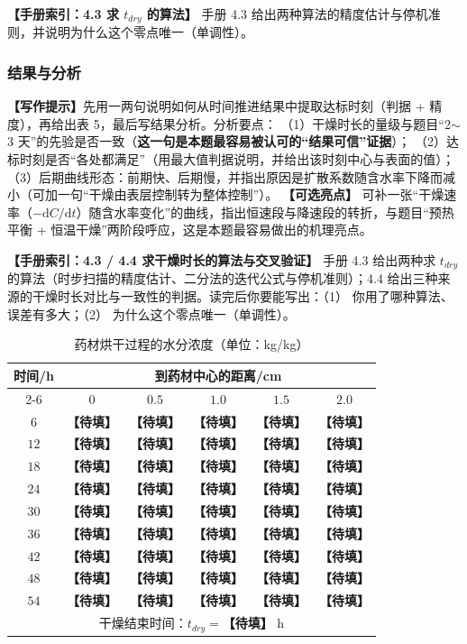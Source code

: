 \documentclass[12pt,a4paper]{article}
\newcommand{\prompt}[1]{\par\noindent\textbf{【写作提示】}#1\par}      %
\newcommand{\ph}[1]{\textbf{【#1】}}                                   %
\newcommand{\handbook}[2]{\par\noindent\textbf{【手册索引：#1】} #2\par}
\begin{document}
\handbook{4.3 求 $t_{dry}$ 的算法}{手册 4.3 给出两种算法的精度估计与停机准则，并说明为什么这个零点唯一（单调性）。}

\subsubsection{结果与分析}

\prompt{先用一两句说明如何从时间推进结果中提取达标时刻（判据 + 精度），再给出表 5，最后写结果分析。分析要点：
（1）干燥时长的量级与题目“2$\sim$3 天”的先验是否一致（\textbf{这一句是本题最容易被认可的“结果可信”证据}）；
（2）达标时刻是否“各处都满足”（用最大值判据说明，并给出该时刻中心与表面的值）；
（3）后期曲线形态：前期快、后期慢，并指出原因是扩散系数随含水率下降而减小（可加一句“干燥由表层控制转为整体控制”）。
\textbf{【可选亮点】} 可补一张“干燥速率（$-\mathrm{d}C/\mathrm{d}t$）随含水率变化”的曲线，指出恒速段与降速段的转折，与题目“预热平衡 + 恒温干燥”两阶段呼应，这是本题最容易做出的机理亮点。}

\handbook{4.3 / 4.4 求干燥时长的算法与交叉验证}{手册 4.3 给出两种求 $t_{dry}$ 的算法（时步扫描的精度估计、二分法的迭代公式与停机准则）；4.4 给出三种来源的干燥时长对比与一致性的判据。读完后你要能写出：（1） 你用了哪种算法、误差有多大；（2） 为什么这个零点唯一（单调性）。}

\begin{table}[H]
\centering
\caption{药材烘干过程的水分浓度（单位：kg/kg）}
\label{tab:q3-moisture}
\begin{tabular}{cccccc}
\toprule
\multirow{2}{*}{时间/h} & \multicolumn{5}{c}{到药材中心的距离/cm}\\
\cmidrule(lr){2-6}
 & $0$ & $0.5$ & $1.0$ & $1.5$ & $2.0$\\
\midrule
$6$  & \ph{待填} & \ph{待填} & \ph{待填} & \ph{待填} & \ph{待填}\\
$12$ & \ph{待填} & \ph{待填} & \ph{待填} & \ph{待填} & \ph{待填}\\
$18$ & \ph{待填} & \ph{待填} & \ph{待填} & \ph{待填} & \ph{待填}\\
$24$ & \ph{待填} & \ph{待填} & \ph{待填} & \ph{待填} & \ph{待填}\\
$30$ & \ph{待填} & \ph{待填} & \ph{待填} & \ph{待填} & \ph{待填}\\
$36$ & \ph{待填} & \ph{待填} & \ph{待填} & \ph{待填} & \ph{待填}\\
$42$ & \ph{待填} & \ph{待填} & \ph{待填} & \ph{待填} & \ph{待填}\\
$48$ & \ph{待填} & \ph{待填} & \ph{待填} & \ph{待填} & \ph{待填}\\
$54$ & \ph{待填} & \ph{待填} & \ph{待填} & \ph{待填} & \ph{待填}\\
\midrule
\multicolumn{6}{c}{干燥结束时间：$t_{dry}=$\ph{待填} h}\\
\bottomrule
\end{tabular}
\end{table}
\end{document}

